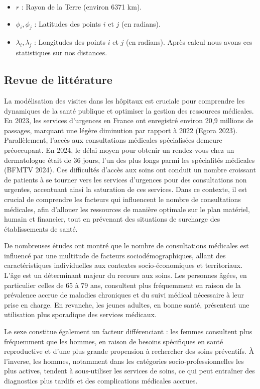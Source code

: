 \documentclass[
]{article}
\begin{document}
\begin{itemize}
\item
  \(r\) : Rayon de la Terre (environ 6371 km).
\item
  \(\phi_i, \phi_j\) : Latitudes des points \(i\) et \(j\) (en radians).
\item
  \(\lambda_i, \lambda_j\) : Longitudes des points \(i\) et \(j\) (en
  radians). Après calcul nous avons ces statistiques sur nos distances.
\end{itemize}

\hypertarget{revue-de-littuxe9rature}{%
\subsection{Revue de littérature}\label{revue-de-littuxe9rature}}

La modélisation des visites dans les hôpitaux est cruciale pour
comprendre les dynamiques de la santé publique et optimiser la gestion
des ressources médicales. En 2023, les services d'urgences en France ont
enregistré environ 20,9 millions de passages, marquant une légère
diminution par rapport à 2022 (Egora 2023). Parallèlement, l'accès aux
consultations médicales spécialisées demeure préoccupant. En 2024, le
délai moyen pour obtenir un rendez-vous chez un dermatologue était de 36
jours, l'un des plus longs parmi les spécialités médicales (BFMTV 2024).
Ces difficultés d'accès aux soins ont conduit un nombre croissant de
patients à se tourner vers les services d'urgences pour des
consultations non urgentes, accentuant ainsi la saturation de ces
services. Dans ce contexte, il est crucial de comprendre les facteurs
qui influencent le nombre de consultations médicales, afin d'allouer les
ressources de manière optimale sur le plan matériel, humain et
financier, tout en prévenant des situations de surcharge des
établissements de santé.

De nombreuses études ont montré que le nombre de consultations médicales
est influencé par une multitude de facteurs sociodémographiques, allant
des caractéristiques individuelles aux contextes socio-économiques et
territoriaux. L'âge est un déterminant majeur du recours aux soins. Les
personnes âgées, en particulier celles de 65 à 79 ans, consultent plus
fréquemment en raison de la prévalence accrue de maladies chroniques et
du suivi médical nécessaire à leur prise en charge. En revanche, les
jeunes adultes, en bonne santé, présentent une utilisation plus
sporadique des services médicaux.

Le sexe constitue également un facteur différenciant : les femmes
consultent plus fréquemment que les hommes, en raison de besoins
spécifiques en santé reproductive et d'une plus grande propension à
rechercher des soins préventifs. À l'inverse, les hommes, notamment dans
les catégories socio-professionnelles les plus actives, tendent à
sous-utiliser les services de soins, ce qui peut entraîner des
diagnostics plus tardifs et des complications médicales accrues.
\end{document}
